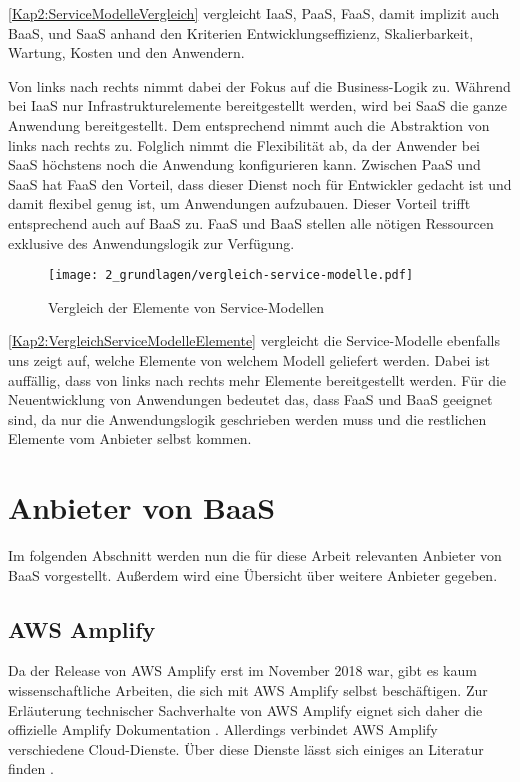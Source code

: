 \autoref{Kap2:ServiceModelleVergleich} vergleicht \ac{IaaS}, \ac{PaaS}, \ac{FaaS}, damit implizit auch \ac{BaaS}, und \ac{SaaS} anhand den Kriterien Entwicklungseffizienz, Skalierbarkeit, Wartung, Kosten und den Anwendern.

Von links nach rechts nimmt dabei der Fokus auf die Business-Logik zu. Während bei \ac{IaaS} nur Infrastrukturelemente bereitgestellt werden, wird bei \ac{SaaS} die ganze Anwendung bereitgestellt. Dem entsprechend nimmt auch die Abstraktion von links nach rechts zu. Folglich nimmt die Flexibilität ab, da der Anwender bei \ac{SaaS} höchstens noch die Anwendung konfigurieren kann. Zwischen \ac{PaaS} und \ac{SaaS} hat \ac{FaaS} den Vorteil, dass dieser Dienst noch für Entwickler gedacht ist und damit flexibel genug ist, um Anwendungen aufzubauen. Dieser Vorteil trifft entsprechend auch auf \ac{BaaS} zu. \ac{FaaS} und \ac{BaaS} stellen alle nötigen Ressourcen exklusive des Anwendungslogik zur Verfügung.

\begin{figure}[h]
  \centering
  \texttt{[image: 2\_grundlagen/vergleich-service-modelle.pdf]}
  \caption{Vergleich der Elemente von Service-Modellen \autocite{jiang2020overview}}
  \label{Kap2:VergleichServiceModelleElemente}
\end{figure}

\autoref{Kap2:VergleichServiceModelleElemente} vergleicht die Service-Modelle ebenfalls uns zeigt auf, welche Elemente von welchem Modell geliefert werden. Dabei ist auffällig, dass von links nach rechts mehr Elemente bereitgestellt werden. Für die Neuentwicklung von Anwendungen bedeutet das, dass \ac{FaaS} und \ac{BaaS} geeignet sind, da nur die Anwendungslogik geschrieben werden muss und die restlichen Elemente vom Anbieter selbst kommen.

\section{Anbieter von \acl{BaaS}}

Im folgenden Abschnitt werden nun die für diese Arbeit relevanten Anbieter von \ac{BaaS} vorgestellt. Außerdem wird eine Übersicht über weitere Anbieter gegeben.

\subsection{\acs{AWS} Amplify}

Da der Release von \ac{AWS} Amplify erst im November 2018 war, gibt es kaum wissenschaftliche Arbeiten, die sich mit \ac{AWS} Amplify selbst beschäftigen. Zur Erläuterung technischer Sachverhalte von \ac{AWS} Amplify eignet sich daher die offizielle Amplify Dokumentation \autocite{amplifyDocs}. Allerdings verbindet \ac{AWS} Amplify verschiedene Cloud-Dienste. Über diese Dienste lässt sich einiges an Literatur finden  \autocite{dahunsi2021commercial}\autocite{lysakov2021security}\autocite{mathew2014overview}\autocite{beach2014aws}.

